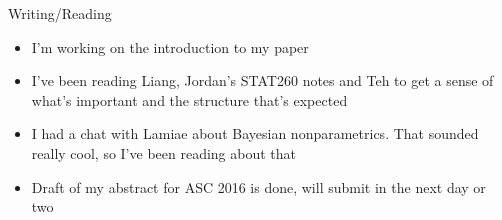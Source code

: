 \documentclass{beamer}
\begin{document}
\begin{frame}{Writing/Reading}
\begin{itemize}
\item I'm working on the introduction to my paper
\item I've been reading Liang, Jordan's STAT260 notes and Teh to get a sense of what's important and the
structure that's expected
\item I had a chat with Lamiae about Bayesian nonparametrics. That sounded really cool, so I've been reading
about that
\item Draft of my abstract for ASC 2016 is done, will submit in the next day or two
\end{itemize}
\end{frame}
\end{document}

